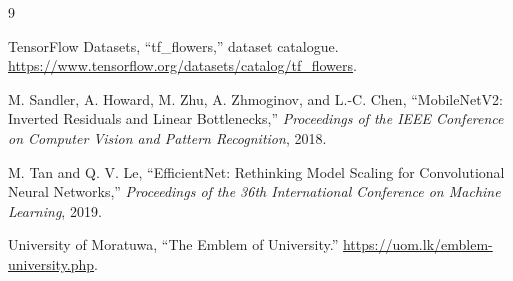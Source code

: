 \documentclass[11pt,a4paper]{article}
\begin{document}
\begin{thebibliography}{9}
\raggedright
{}
TensorFlow Datasets, ``tf\_flowers,'' dataset catalogue.
\url{https://www.tensorflow.org/datasets/catalog/tf_flowers}.

M. Sandler, A. Howard, M. Zhu, A. Zhmoginov, and L.-C. Chen,
``MobileNetV2: Inverted Residuals and Linear Bottlenecks,''
\emph{Proceedings of the IEEE Conference on Computer Vision and Pattern
Recognition}, 2018.

M. Tan and Q. V. Le, ``EfficientNet: Rethinking Model Scaling for
Convolutional Neural Networks,'' \emph{Proceedings of the 36th International
Conference on Machine Learning}, 2019.

University of Moratuwa, ``The Emblem of University.''
\url{https://uom.lk/emblem-university.php}.
\end{thebibliography}
\end{document}
